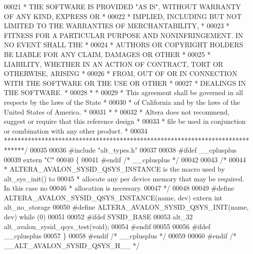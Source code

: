 \begin{DoxyCode}
00021 \textcolor{comment}{* THE SOFTWARE IS PROVIDED "AS IS", WITHOUT WARRANTY OF ANY KIND, EXPRESS OR  *}
00022 \textcolor{comment}{* IMPLIED, INCLUDING BUT NOT LIMITED TO THE WARRANTIES OF MERCHANTABILITY,    *}
00023 \textcolor{comment}{* FITNESS FOR A PARTICULAR PURPOSE AND NONINFRINGEMENT. IN NO EVENT SHALL THE *}
00024 \textcolor{comment}{* AUTHORS OR COPYRIGHT HOLDERS BE LIABLE FOR ANY CLAIM, DAMAGES OR OTHER      *}
00025 \textcolor{comment}{* LIABILITY, WHETHER IN AN ACTION OF CONTRACT, TORT OR OTHERWISE, ARISING     *}
00026 \textcolor{comment}{* FROM, OUT OF OR IN CONNECTION WITH THE SOFTWARE OR THE USE OR OTHER         *}
00027 \textcolor{comment}{* DEALINGS IN THE SOFTWARE.                                                   *}
00028 \textcolor{comment}{*                                                                             *}
00029 \textcolor{comment}{* This agreement shall be governed in all respects by the laws of the State   *}
00030 \textcolor{comment}{* of California and by the laws of the United States of America.              *}
00031 \textcolor{comment}{*                                                                             *}
00032 \textcolor{comment}{* Altera does not recommend, suggest or require that this reference design    *}
00033 \textcolor{comment}{* file be used in conjunction or combination with any other product.          *}
00034 \textcolor{comment}{******************************************************************************/}
00035 
00036 \textcolor{preprocessor}{#include "alt_types.h"}
00037 
00038 \textcolor{preprocessor}{#ifdef \_\_cplusplus}
00039 \textcolor{keyword}{extern} \textcolor{stringliteral}{"C"}
00040 \{
00041 \textcolor{preprocessor}{#endif }\textcolor{comment}{/* \_\_cplusplus */}\textcolor{preprocessor}{}
00042 
00043 \textcolor{comment}{/*}
00044 \textcolor{comment}{ * ALTERA\_AVALON\_SYSID\_QSYS\_INSTANCE is the macro used by alt\_sys\_init() to}
00045 \textcolor{comment}{ * allocate any per device memory that may be required. In this case no}
00046 \textcolor{comment}{ * allocation is necessary.}
00047 \textcolor{comment}{ */}
00048 
00049 \textcolor{preprocessor}{#define ALTERA\_AVALON\_SYSID\_QSYS\_INSTANCE(name, dev) extern int alt\_no\_storage}
00050 \textcolor{preprocessor}{#define ALTERA\_AVALON\_SYSID\_QSYS\_INIT(name, dev) while (0)}
00051 
00052 \textcolor{preprocessor}{#ifdef SYSID\_BASE}
00053 alt_32 alt\_avalon\_sysid\_qsys\_test(\textcolor{keywordtype}{void});
00054 \textcolor{preprocessor}{#endif}
00055 
00056 \textcolor{preprocessor}{#ifdef \_\_cplusplus}
00057 \}
00058 \textcolor{preprocessor}{#endif }\textcolor{comment}{/* \_\_cplusplus */}\textcolor{preprocessor}{}
00059 
00060 \textcolor{preprocessor}{#endif }\textcolor{comment}{/* \_\_ALT\_AVALON\_SYSID\_QSYS\_H\_\_ */}\textcolor{preprocessor}{}
\end{DoxyCode}
